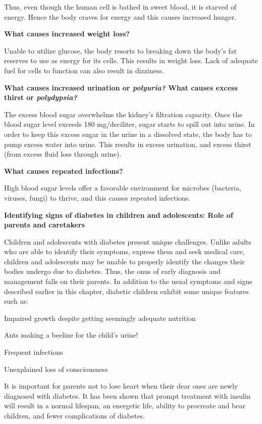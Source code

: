 Thus, even though the human cell is bathed in sweet blood, it is starved of energy. Hence the body craves for energy and this causes increased hunger.

\textbf{What causes increased weight loss?}

Unable to utilize glucose, the body resorts to breaking down the body’s fat reserves to use as energy for its cells. This results in weight loss. Lack of adequate fuel for cells to function can also result in dizziness.

\textbf{What causes increased urination or \textit{polyuria?} What causes excess thirst or \textit{polydypsia?}}

The excess blood sugar overwhelms the kidney’s filtration capacity. Once the blood sugar level exceeds 180 mg/deciliter, sugar starts to spill out into urine. In order to keep this excess sugar in the urine in a dissolved state, the body has to pump excess water into urine. This results in excess urination, and excess thirst (from excess fluid loss through urine).

\textbf{What causes repeated infections?}

High blood sugar levels offer a favorable environment for microbes (bacteria, viruses, fungi) to thrive, and this causes repeated infections.

\textbf{Identifying signs of diabetes in children and adolescents: Role of parents and caretakers}

Children and adolescents with diabetes present unique challenges. Unlike adults who are able to identify their symptoms, express them and seek medical care, children and adolescents may be unable to properly identify the changes their bodies undergo due to diabetes. Thus, the onus of early diagnosis and management falls on their parents. In addition to the usual symptoms and signs described earlier in this chapter, diabetic children exhibit some unique features such as:

\item Impaired growth despite getting seemingly adequate nutrition

 \item Ants making a beeline for the child’s urine!

 \item Frequent infections

 \item Unexplained loss of consciousness

It is important for parents not to lose heart when their dear ones are newly diagnosed with diabetes. It has been shown that prompt treatment with insulin will result in a normal lifespan, an energetic life, ability to procreate and bear children, and fewer complications of diabetes.

